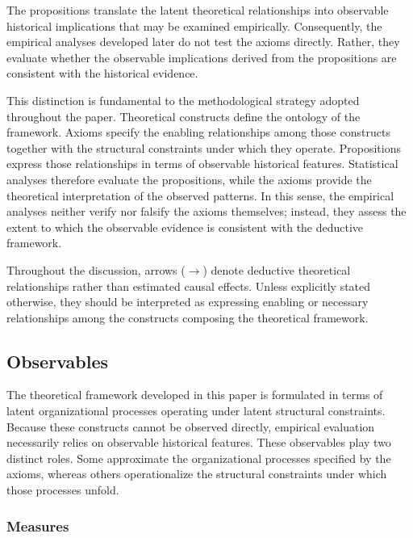 \documentclass[doc, 12pt, a4paper,floatsintext]{apa7}
\begin{document}
The propositions translate the latent theoretical relationships into observable historical implications that may be examined empirically. Consequently, the empirical analyses developed later do not test the axioms directly. Rather, they evaluate whether the observable implications derived from the propositions are consistent with the historical evidence.

This distinction is fundamental to the methodological strategy adopted throughout the paper. Theoretical constructs define the ontology of the framework. Axioms specify the enabling relationships among those constructs together with the structural constraints under which they operate. Propositions express those relationships in terms of observable historical features. Statistical analyses therefore evaluate the propositions, while the axioms provide the theoretical interpretation of the observed patterns. In this sense, the empirical analyses neither verify nor falsify the axioms themselves; instead, they assess the extent to which the observable evidence is consistent with the deductive framework.

Throughout the discussion, arrows ($\rightarrow$) denote deductive theoretical relationships rather than estimated causal effects. Unless explicitly stated otherwise, they should be interpreted as expressing enabling or necessary relationships among the constructs composing the theoretical framework.

%
%
\subsection{Observables}

The theoretical framework developed in this paper is formulated in terms of latent organizational processes operating under latent structural constraints. Because these constructs cannot be observed directly, empirical evaluation necessarily relies on observable historical features. These observables play two distinct roles. Some approximate the organizational processes specified by the axioms, whereas others operationalize the structural constraints under which those processes unfold.

\subsubsection{Measures}
\end{document}
